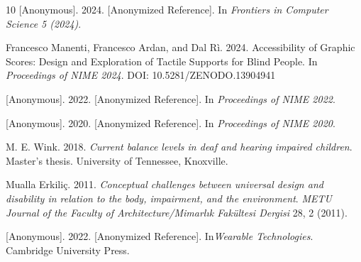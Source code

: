 \documentclass[manuscript,screen,review,anonymous]{acmart}
\begin{document}
\begin{thebibliography}{10}
[Anonymous]. 2024.
[Anonymized Reference].
In \textit{Frontiers in Computer Science 5 (2024)}.



Francesco Manenti, Francesco Ardan, and Dal Rì. 2024.
Accessibility of Graphic Scores: Design and Exploration of Tactile Supports for Blind People.
In \textit{Proceedings of NIME 2024}.
DOI: 10.5281/ZENODO.13904941

[Anonymous]. 2022.
[Anonymized Reference].
In \textit{Proceedings of NIME 2022}.


[Anonymous]. 2020.
[Anonymized Reference].
In \textit{Proceedings of NIME 2020}.


M. E. Wink. 2018.
\textit{Current balance levels in deaf and hearing impaired children}.
Master's thesis. University of Tennessee, Knoxville.

Mualla Erkili\c{c}. 2011.
\textit{Conceptual challenges between universal design and disability in relation to the body, impairment, and the environment}.
\textit{METU Journal of the Faculty of Architecture/Mimarl{\i}k Fak{\"u}ltesi Dergisi} 28, 2 (2011).

[Anonymous]. 2022.
[Anonymized Reference].
In\textit{Wearable Technologies}. Cambridge University Press.



\end{thebibliography}
\end{document}
